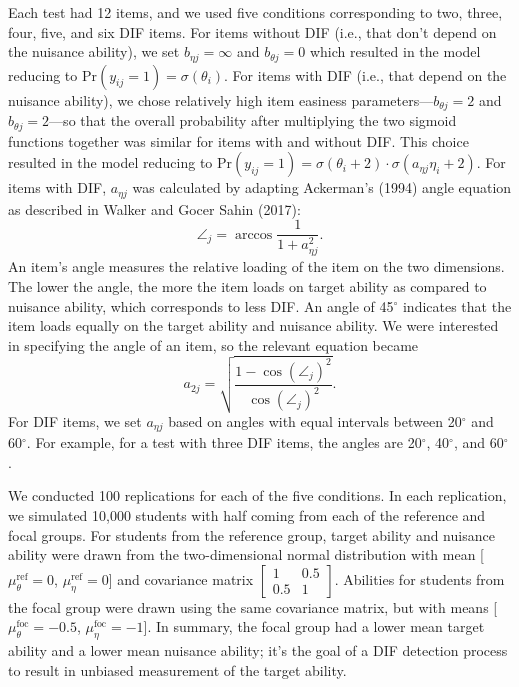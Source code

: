 \documentclass[
  english,
  man,floatsintext]{apa6}
\begin{document}
Each test had 12 items, and we used five conditions corresponding to two, three, four, five, and six DIF items. For items without DIF (i.e., that don't depend on the nuisance ability), we set \(b_{\eta j} = \infty\) and \(b_{\theta j} = 0\) which resulted in the model reducing to \(\text{Pr}(y_{ij} = 1) = \sigma(\theta_i)\). For items with DIF (i.e., that depend on the nuisance ability), we chose relatively high item easiness parameters---\(b_{\theta j} = 2\) and \(b_{\theta j} = 2\)---so that the overall probability after multiplying the two sigmoid functions together was similar for items with and without DIF. This choice resulted in the model reducing to \(\text{Pr}(y_{ij} = 1) = \sigma(\theta_i + 2) \cdot \sigma(a_{\eta j}\eta_i + 2)\). For items with DIF, \(a_{\eta j}\) was calculated by adapting Ackerman's (1994) angle equation as described in Walker and Gocer Sahin (2017):
\begin{equation}
\angle_j = \arccos \dfrac{1}{1 + a_{\eta j}^2}.
\end{equation}
An item's angle measures the relative loading of the item on the two dimensions. The lower the angle, the more the item loads on target ability as compared to nuisance ability, which corresponds to less DIF. An angle of 45\(^\circ\) indicates that the item loads equally on the target ability and nuisance ability. We were interested in specifying the angle of an item, so the relevant equation became
\begin{equation}
a_{2j} = \sqrt{\dfrac{1 - \cos(\angle_j)^2}{\cos(\angle_j)^2}}.
\end{equation}
For DIF items, we set \(a_{\eta j}\) based on angles with equal intervals between 20\(^\circ\) and 60\(^\circ\). For example, for a test with three DIF items, the angles are 20\(^\circ\), 40\(^\circ\), and 60\(^\circ\).

We conducted 100 replications for each of the five conditions. In each replication, we simulated 10,000 students with half coming from each of the reference and focal groups. For students from the reference group, target ability and nuisance ability were drawn from the two-dimensional normal distribution with mean {[}\(\mu_\theta^\text{ref} = 0\), \(\mu_\eta^\text{ref} = 0\){]} and covariance matrix \(\begin{bmatrix} 1 & 0.5 \\ 0.5 & 1 \end{bmatrix}\). Abilities for students from the focal group were drawn using the same covariance matrix, but with means {[}\(\mu_\theta^\text{foc} = -0.5\), \(\mu_\eta^\text{foc} = -1\){]}. In summary, the focal group had a lower mean target ability and a lower mean nuisance ability; it's the goal of a DIF detection process to result in unbiased measurement of the target ability.
\end{document}
